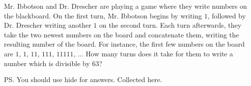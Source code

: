 Mr. Ibbotson and Dr. Drescher are playing a game where they write numbers on the blackboard. On the first turn, Mr. Ibbotson begins by writing $1$, followed by Dr. Drescher writing another $1$ on the second turn. Each turn afterwards, they take the two newest numbers on the board and concatenate them, writing the resulting number of the board. For instance, the first few numbers on the board are $1$, $1$, $11$, $111$, $11111$, $...$  How many turns does it take for them to write a number which is divisible by $63$?





PS. You should use hide for answers. Collected here.
